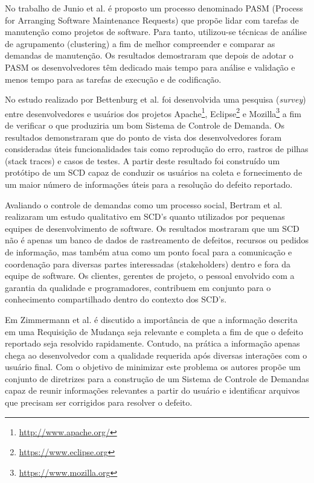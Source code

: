 \documentclass[msc,proposal,hidelot,hideabstract]{ppgccufmg} %
\begin{document}
No trabalho de Junio et al. \cite{5741246} é proposto um processo denominado PASM (Process for Arranging
Software Maintenance Requests) que propõe lidar com tarefas de manutenção como
projetos de software. Para tanto, utilizou-se técnicas de análise de
agrupamento (clustering) a fim de melhor compreender e comparar as demandas de
manutenção. Os resultados demostraram que depois de adotar o PASM os
desenvolvedores têm dedicado mais tempo para análise e validação e menos tempo
para as tarefas de execução e de codificação.

No estudo realizado por Bettenburg et al. \cite{bettenburg2008makes} foi
desenvolvida uma pesquisa (\textit{survey}) entre desenvolvedores e usuários dos
projetos Apache\footnote{\url{http://www.apache.org/}},
Eclipse\footnote{\url{https://www.eclipse.org}} e
Mozilla\footnote{\url{https://www.mozilla.org}} a fim de verificar o que
produziria um bom Sistema de Controle de Demanda. Os resultados demonstraram
que do ponto de vista dos desenvolvedores foram consideradas úteis
funcionalidades tais como reprodução do erro, rastros de pilhas (stack traces) e casos de
testes. A partir deste resultado foi construído um protótipo de um SCD
capaz de conduzir os usuários na coleta e fornecimento de um maior número de
informações úteis para a resolução do defeito reportado.

Avaliando o controle de demandas como um processo social, Bertram et
al. \cite{Bertram:2010:CCB:1718918.1718972} realizaram um estudo qualitativo em
SCD's quanto utilizados por pequenas equipes de desenvolvimento de software. Os resultados mostraram que um SCD não é apenas um
banco de dados de rastreamento de defeitos, recursos ou pedidos de informação, mas
também atua como um ponto focal para a comunicação e coordenação para diversas
partes interessadas (stakeholders) dentro e fora da equipe de software. Os
clientes, gerentes de projeto, o pessoal envolvido com a garantia da qualidade
e programadores, contribuem em conjunto para o conhecimento compartilhado dentro do contexto dos SCD's.

Em Zimmermann et al. \cite{5070993} é discutido a importância de que a
informação descrita em uma Requisição de Mudança seja relevante e completa
a fim de que o defeito reportado seja resolvido rapidamente. Contudo, na prática
a informação apenas chega ao desenvolvedor com a qualidade requerida após
diversas interações com o usuário final. Com o objetivo de minimizar este
problema os autores propõe um conjunto de diretrizes para a construção de um
Sistema de Controle de Demandas capaz de reunir informações relevantes a partir do usuário e identificar arquivos que precisam
ser corrigidos para resolver o defeito.
\end{document}
